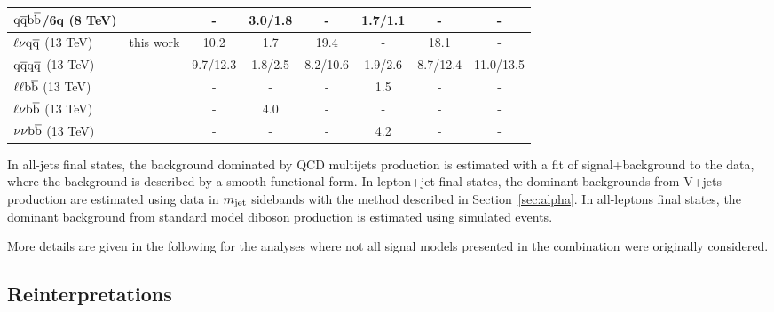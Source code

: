 \begin{table}[htb]
\begin{tabular}{l|c|c c|c c|c c}
 $\mathrm{q}\overline{\mathrm{q}}{\mathrm{b}\overline{\mathrm{b}}}$/6q (8 TeV) & \cite{Khachatryan:2015bma} &  - &  3.0/1.8 &  - &  1.7/1.1 &  - &  -\\
    \hline
 $\ell \nu \mathrm{q}\overline{\mathrm{q}}$ (13 TeV) & this work &  10.2 &  1.7 &  19.4 &  - &  18.1 &  -\\
 $\mathrm{q}\overline{\mathrm{q}} \mathrm{q}\overline{\mathrm{q}}$ (13 TeV) & \cite{CMS-PAS-EXO-15-002} &  9.7/12.3 &  1.8/2.5 &  8.2/10.6 & 1.9/2.6 &  8.7/12.4 &  11.0/13.5\\
    \hline
 $\ell\ell{\mathrm{b}\overline{\mathrm{b}}}$ (13 TeV) & \cite{Khachatryan:2016cfx} &  - &  - &  - &  1.5 &  - &  -\\
 $\ell\nu{\mathrm{b}\overline{\mathrm{b}}}$ (13 TeV) & \cite{Khachatryan:2016cfx} &  - &  4.0 &  - &  - &  - &  -\\
 $\nu\nu{\mathrm{b}\overline{\mathrm{b}}}$ (13 TeV)  & \cite{Khachatryan:2016cfx} &  - &  - &  - &  4.2 &  - &  -\\
   \hline
  \end{tabular}
  \label{tab:efficiencies}
\end{table}

In all-jets final states, the background dominated by QCD multijets production is estimated with a fit of signal+background to the data, where the background is described by a smooth functional form.
In lepton+jet final states, the dominant backgrounds from V+jets production are estimated using data in $m_{\text{jet}}$ sidebands with the method described in Section~\ref{sec:alpha}.
In all-leptons final states, the dominant background from standard model diboson production is estimated using simulated events.

More details are given in the following for the analyses where not all signal models presented in the combination were originally considered.

\subsection{Reinterpretations}


